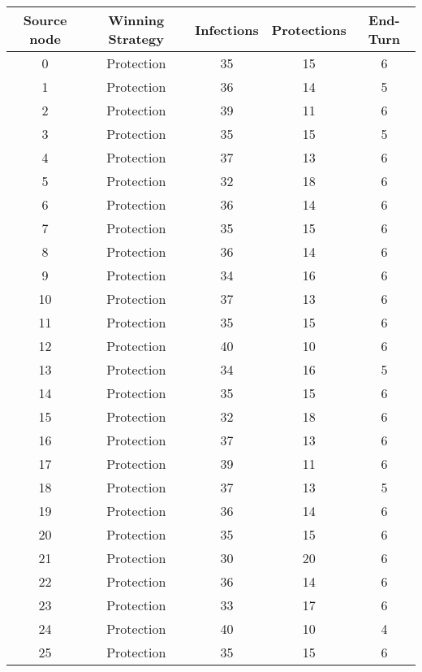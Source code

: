 \documentclass[results.tex]{subfiles}
\begin{document}
\begin{center}
  \begin{tabular}{| c || c | c | c | c |}
    \hline
    {\bfseries Source node} & {\bfseries Winning Strategy} & {\bfseries Infections} & {\bfseries Protections} & {\bfseries End-Turn} \\  %
    \hline\hline
    0 & Protection & 35 & 15 & 6 \\ 
    \hline
    1 & Protection & 36 & 14 & 5 \\ 
    \hline
    2 & Protection & 39 & 11 & 6 \\ 
    \hline
    3 & Protection & 35 & 15 & 5 \\ 
    \hline
    4 & Protection & 37 & 13 & 6 \\ 
    \hline
    5 & Protection & 32 & 18 & 6 \\ 
    \hline
    6 & Protection & 36 & 14 & 6 \\ 
    \hline
    7 & Protection & 35 & 15 & 6 \\ 
    \hline
    8 & Protection & 36 & 14 & 6 \\ 
    \hline
    9 & Protection & 34 & 16 & 6 \\ 
    \hline
    10 & Protection & 37 & 13 & 6 \\ 
    \hline
    11 & Protection & 35 & 15 & 6 \\ 
    \hline
    12 & Protection & 40 & 10 & 6 \\ 
    \hline
    13 & Protection & 34 & 16 & 5 \\ 
    \hline
    14 & Protection & 35 & 15 & 6 \\ 
    \hline
    15 & Protection & 32 & 18 & 6 \\ 
    \hline
    16 & Protection & 37 & 13 & 6 \\ 
    \hline
    17 & Protection & 39 & 11 & 6 \\ 
    \hline
    18 & Protection & 37 & 13 & 5 \\ 
    \hline
    19 & Protection & 36 & 14 & 6 \\ 
    \hline
    20 & Protection & 35 & 15 & 6 \\ 
    \hline
    21 & Protection & 30 & 20 & 6 \\ 
    \hline
    22 & Protection & 36 & 14 & 6 \\ 
    \hline
    23 & Protection & 33 & 17 & 6 \\ 
    \hline
    24 & Protection & 40 & 10 & 4 \\ 
    \hline
    25 & Protection & 35 & 15 & 6 \\ 

\end{tabular}
\end{center}
\end{document}
